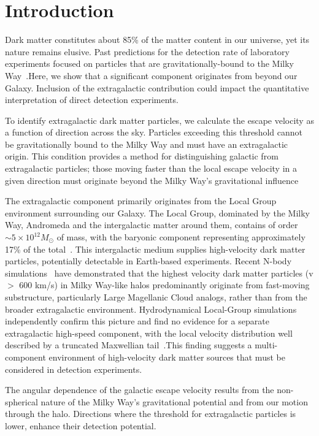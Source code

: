 \documentclass[%
 reprint,
 amsmath,amssymb,
 aps,
]{revtex4-2}
\begin{document}
\section{Introduction}


Dark matter constitutes about 85\% of the matter content in our universe, yet its nature remains elusive. Past predictions for the detection rate of laboratory experiments focused on particles that are gravitationally-bound to the Milky Way~\cite{Lewin1996,Jungman1996,Bertone2005,Freese2013}.Here, we show that a significant component originates from beyond our Galaxy. Inclusion of the extragalactic contribution could impact the quantitative interpretation of direct detection experiments.~\cite{2021PhLB..82036551H}

To identify extragalactic dark matter particles, we calculate the escape velocity as a function of direction across the sky. Particles exceeding this threshold cannot be gravitationally bound to the Milky Way and must have an extragalactic origin. This condition provides a method for distinguishing galactic from extragalactic particles; those moving faster than the local escape velocity in a given direction must originate beyond the Milky Way's gravitational influence~\cite{2013ApJ...771..117B}

The extragalactic component primarily originates from the Local Group environment surrounding our Galaxy. The Local Group, dominated by the Milky Way, Andromeda and the intergalactic matter around them, contains of order $\sim 5\times 10^{12}M_{\odot}$ of mass, with the baryonic component representing approximately 17\% of the total~\cite{Rubin2014}. This intergalactic medium supplies high-velocity dark matter particles, potentially detectable in Earth-based experiments. Recent N-body simulations~\cite{DeBrae2025} have demonstrated that the highest velocity dark matter particles (v $>$ 600 km/s) in Milky Way-like halos predominantly originate from fast-moving substructure, particularly Large Magellanic Cloud analogs, rather than from the broader extragalactic environment. Hydrodynamical Local-Group simulations independently confirm this picture and find no evidence for a separate extragalactic high-speed component, with the local velocity distribution well described by a truncated Maxwellian tail~\cite{2024JCAP...03..046S}.This finding suggests a multi-component environment of high-velocity dark matter sources that must be considered in detection experiments.

The angular dependence of the galactic escape velocity results from the non-spherical nature of the Milky Way's gravitational potential and from our motion through the halo. Directions where the threshold for extragalactic particles is lower, enhance their detection potential.
\end{document}

